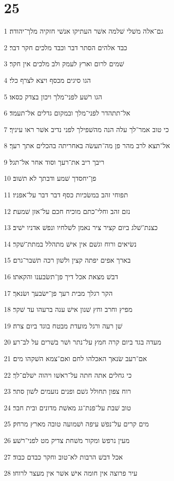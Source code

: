 \chapter{25}

\par 1 גם־אלה משׁלי שׁלמה אשׁר העתיקו אנשׁי חזקיה מלך־יהודה׃
\par 2 כבד אלהים הסתר דבר וכבד מלכים חקר דבר׃
\par 3 שׁמים לרום וארץ לעמק ולב מלכים אין חקר׃
\par 4 הגו סיגים מכסף ויצא לצרף כלי׃
\par 5 הגו רשׁע לפני־מלך ויכון בצדק כסאו׃
\par 6 אל־תתהדר לפני־מלך ובמקום גדלים אל־תעמד׃
\par 7 כי טוב אמר־לך עלה הנה מהשׁפילך לפני נדיב אשׁר ראו עיניך׃
\par 8 אל־תצא לרב מהר פן מה־תעשׂה באחריתה בהכלים אתך רעך׃
\par 9 ריבך ריב את־רעך וסוד אחר אל־תגל׃
\par 10 פן־יחסדך שׁמע ודבתך לא תשׁוב׃
\par 11 תפוחי זהב במשׂכיות כסף דבר דבר על־אפניו׃
\par 12 נזם זהב וחלי־כתם מוכיח חכם על־אזן שׁמעת׃
\par 13 כצנת־שׁלג ביום קציר ציר נאמן לשׁלחיו ונפשׁ אדניו ישׁיב׃
\par 14 נשׂיאים ורוח וגשׁם אין אישׁ מתהלל במתת־שׁקר׃
\par 15 בארך אפים יפתה קצין ולשׁון רכה תשׁבר־גרם׃
\par 16 דבשׁ מצאת אכל דיך פן־תשׂבענו והקאתו׃
\par 17 הקר רגלך מבית רעך פן־ישׂבעך ושׂנאך׃
\par 18 מפיץ וחרב וחץ שׁנון אישׁ ענה ברעהו עד שׁקר׃
\par 19 שׁן רעה ורגל מועדת מבטח בוגד ביום צרה׃
\par 20 מעדה בגד ביום קרה חמץ על־נתר ושׁר בשׁרים על לב־רע׃
\par 21 אם־רעב שׂנאך האכלהו לחם ואם־צמא השׁקהו מים׃
\par 22 כי גחלים אתה חתה על־ראשׁו ויהוה ישׁלם־לך׃
\par 23 רוח צפון תחולל גשׁם ופנים נזעמים לשׁון סתר׃
\par 24 טוב שׁבת על־פנת־גג מאשׁת מדונים ובית חבר׃
\par 25 מים קרים על־נפשׁ עיפה ושׁמועה טובה מארץ מרחק׃
\par 26 מעין נרפשׂ ומקור משׁחת צדיק מט לפני־רשׁע׃
\par 27 אכל דבשׁ הרבות לא־טוב וחקר כבדם כבוד׃
\par 28 עיר פרוצה אין חומה אישׁ אשׁר אין מעצר לרוחו׃

